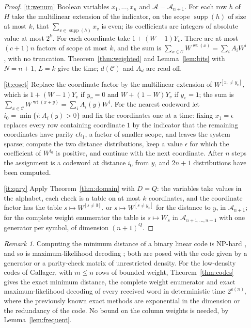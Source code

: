 \documentclass[11pt,reqno]{amsart}
\numberwithin{equation}{section}
\theoremstyle{plain}
\theoremstyle{definition}
\theoremstyle{remark}
\newtheorem{remark}[theorem]{Remark}
\newcommand{\A}{\mathcal{A}}
\begin{document}
\begin{proof}
\ref{it:wenum} Boolean variables $x_1,\dots,x_n$ and $\A=\A_{n+1}$. For each row
$h$ of $H$ take the multilinear extension of the indicator, on the scope
$\operatorname{supp}(h)$ of size at most $k$, that $\sum_{v\in\operatorname{supp}(h)}x_v$
is even; its coefficients are integers of absolute value at most $2^{k}$. For
each coordinate take $1+(W-1)Y_v$. There are at most $(c+1)n$ factors of scope at
most $k$, and the sum is $\sum_{x\in\mathcal C}W^{\operatorname{wt}(x)}=\sum_iA_iW^{i}$,
with no truncation. Theorem~\ref{thm:weighted} and Lemma~\ref{lem:bits} with
$N=n+1$, $L=k$ give the time; $d(\mathcal C)$ and $A_{d}$ are read off.

\ref{it:coset} Replace the coordinate factor by the multilinear extension of
$W^{[x_v\ne y_v]}$, which is $1+(W-1)Y_v$ if $y_v=0$ and $W+(1-W)Y_v$ if $y_v=1$;
the sum is $\sum_{x\in\mathcal C}W^{\operatorname{wt}(x+y)}=\sum_iA_i(y)W^{i}$. For
the nearest codeword let $i_0=\min\{i:A_i(y)>0\}$ and fix the coordinates one at
a time: fixing $x_1=\epsilon$ replaces every row containing coordinate $1$ by
the indicator that the remaining coordinates have parity $\epsilon h_1$, a
factor of smaller scope, and leaves the system sparse; compute the two distance
distributions, keep a value $\epsilon$ for which the coefficient of
$W^{i_0}$ is positive, and continue with the next coordinate. After $n$ steps the
assignment is a codeword at distance $i_0$ from $y$, and $2n+1$ distributions
have been computed.

\ref{it:qary} Apply Theorem~\ref{thm:domain} with $D=Q$: the variables take
values in the alphabet, each check is a table on at most $k$ coordinates, and
the coordinate factor has the table $s\mapsto W^{[s\ne0]}$, or
$s\mapsto W^{[s\ne y_v]}$ for the distance to $y$, in $\A_{n+1}$; for the
complete weight enumerator the table is $s\mapsto W_s$ in
$\A_{n+1,\dots,n+1}$ with one generator per symbol, of dimension $(n+1)^{Q}$.
\end{proof}

\begin{remark}
Computing the minimum distance of a binary linear code is NP-hard
\cite{Var97}, and so is maximum-likelihood decoding \cite{BMT78}; both are
posed with the code given by a generator or a parity-check matrix of
unrestricted density. For the low-density codes of Gallager, with $m\le n$ rows
of bounded weight, Theorem~\ref{thm:codes} gives the exact minimum distance, the
complete weight enumerator and exact maximum-likelihood decoding of every
received word in deterministic time $2^{o(n)}$, where the previously known
exact methods are exponential in the dimension or the redundancy of the code.
No bound on the column weights is needed, by Lemma~\ref{lem:frequent}.
\end{remark}
\end{document}
